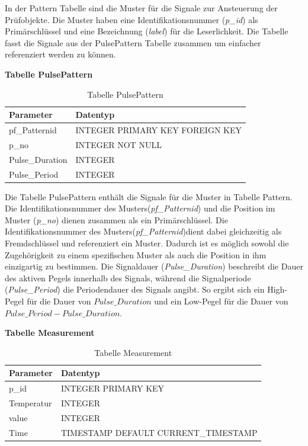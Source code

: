 In der Pattern Tabelle sind die Muster für die Signale zur Ansteuerung der Prüfobjekte. Die Muster haben eine Identifikationsnummer (\textit{p\_id}) als Primärschlüssel und eine Bezeichnung (\textit{label}) für die Leserlichkeit. Die Tabelle fasst die Signale aus der PulsePattern Tabelle zusammen um einfacher referenziert werden zu können.


\textbf{Tabelle PulsePattern}\\

\begin{table}[H]
\begin{center}
\begin{tabular}{|l|l|}\hline
Parameter & Datentyp \\ \hline
pf\_Patternid & INTEGER PRIMARY KEY FOREIGN KEY\\ 
p\_no & INTEGER NOT NULL\\
Pulse\_Duration & INTEGER\\
Pulse\_Period & INTEGER\\ \hline
\end{tabular}
\caption{Tabelle PulsePattern}
\label{table_TabellePulsePattern}
\end{center}
\end{table}

Die Tabelle PulsePattern enthält die Signale für die Muster in Tabelle Pattern. Die Identifikationsnummer des Musters(\textit{pf\_Patternid}) und die Position im Muster (\textit{p\_no}) dienen zusammen als ein Primärschlüssel. Die Identifikationsnummer des Musters(\textit{pf\_Patternid})dient dabei gleichzeitig als Fremdschlüssel und referenziert ein Muster. Dadurch ist es möglich sowohl die Zugehörigkeit zu einem spezifischen Muster als auch die Position in ihm einzigartig zu bestimmen. Die Signaldauer (\textit{Pulse\_Duration}) beschreibt die Dauer des aktiven Pegels innerhalb des Signals, während die Signalperiode (\textit{Pulse\_Period}) die Periodendauer des Signals angibt. So ergibt sich ein High-Pegel für die Dauer von $Pulse\_Duration$ und ein Low-Pegel für die Dauer von $Pulse\_Period - Pulse\_Duration$.\\

\newpage

\textbf{Tabelle Measurement}\\

\begin{table}[H]
\begin{center}
\begin{tabular}{|l|l|}\hline
Parameter & Datentyp \\ \hline
p\_id & INTEGER PRIMARY KEY \\ 
Temperatur & INTEGER\\
value & INTEGER\\
Time & TIMESTAMP DEFAULT CURRENT\_TIMESTAMP\\ \hline
\end{tabular}
\caption{Tabelle Measurement}
\label{table_TabelleMeasurement}
\end{center}
\end{table}

